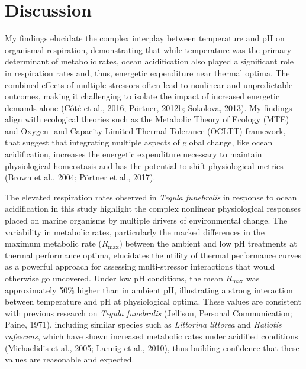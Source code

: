 \documentclass{CSUNthesis}
\begin{document}
\section*{Discussion}\label{discussion}

My findings elucidate the complex interplay between temperature and pH on organismal respiration, demonstrating that while temperature was the primary determinant of metabolic rates, ocean acidification also played a significant role in respiration rates and, thus, energetic expenditure near thermal optima. The combined effects of multiple stressors often lead to nonlinear and unpredictable outcomes, making it challenging to isolate the impact of increased energetic demands alone (Côté et al., 2016; Pörtner, 2012b; Sokolova, 2013). My findings align with ecological theories such as the Metabolic Theory of Ecology (MTE) and Oxygen- and Capacity-Limited Thermal Tolerance (OCLTT) framework, that suggest that integrating multiple aspects of global change, like ocean acidification, increases the energetic expenditure necessary to maintain physiological homeostasis and has the potential to shift physiological metrics (Brown et al., 2004; Pörtner et al., 2017).

The elevated respiration rates observed in \textit{Tegula funebralis} in response to ocean acidification in this study highlight the complex nonlinear physiological responses placed on marine organisms by multiple drivers of environmental change. The variability in metabolic rates, particularly the marked differences in the maximum metabolic rate (\(R_{\text{max}}\)) between the ambient and low pH treatments at thermal performance optima, elucidates the utility of thermal performance curves as a powerful approach for assessing multi-stressor interactions that would otherwise go uncovered. Under low pH conditions, the mean \(R_{\text{max}}\) was approximately 50\% higher than in ambient pH, illustrating a strong interaction between temperature and pH at physiological optima. These values are consistent with previous research on \textit{Tegula funebralis} (Jellison, Personal Communication; Paine, 1971), including similar species such as \textit{Littorina littorea} and \textit{Haliotis rufescens}, which have shown increased metabolic rates under acidified conditions (Michaelidis et al., 2005; Lannig et al., 2010), thus building confidence that these values are reasonable and expected.
\end{document}
